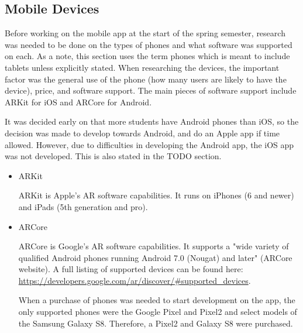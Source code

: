 
\subsection{Mobile Devices}

    Before working on the mobile app at the start of the spring semester, research was needed to be done on the types of phones and what software was supported on each.  As a note, this section uses the term phones which is meant to include tablets unless explicitly stated.  When researching the devices, the important factor was the general use of the phone (how many users are likely to have the device), price, and software support.  The main pieces of software support include ARKit for iOS and ARCore for Android.

    It was decided early on that more students have Android phones than iOS, so the decision was made to develop towards Android, and do an Apple app if time allowed.  However, due to difficulties in developing the Android app, the iOS app was not developed.  This is also stated in the TODO section.

    \begin{itemize}
        \item ARKit

            ARKit is Apple's AR software capabilities.  It runs on iPhones (6 and newer) and iPads (5th generation and pro).  

        \item ARCore

            ARCore is Google's AR software capabilities.  It supports a "wide variety of qualified Android phones running Android 7.0 (Nougat) and later" (ARCore website).  A full listing of supported devices can be found here: \url{https://developers.google.com/ar/discover/#supported_devices}.

            When a purchase of phones was needed to start development on the app, the only supported phones were the Google Pixel and Pixel2 and select models of the Samsung Galaxy S8.  Therefore, a Pixel2 and Galaxy S8 were purchased.
    \end{itemize}